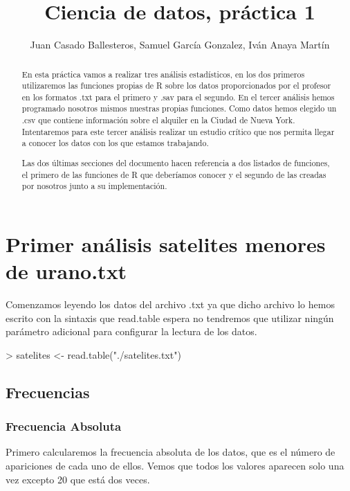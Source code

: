 \documentclass [a4paper] {article}
\title{Ciencia de datos, práctica 1}
\author{Juan Casado Ballesteros, Samuel García Gonzalez, Iván Anaya Martín}
\begin{document}
\maketitle

\begin{abstract}
En esta práctica vamos a realizar tres análisis estadísticos, 
en los dos primeros utilizaremos las funciones propias de R sobre los datos proporcionados por el profesor en los formatos .txt para el primero y .sav para el segundo.
En el tercer análisis hemos programado nosotros mismos nuestras propias funciones. 
Como datos hemos elegido un .csv que contiene información sobre el alquiler en la Ciudad de Nueva York.
Intentaremos para este tercer análisis realizar un estudio crítico que nos permita llegar a conocer los datos con los que estamos trabajando.

Las dos últimas secciones del documento hacen referencia a dos listados de funciones, 
el primero de las funciones de R que deberíamos conocer y el segundo de las creadas por nosotros junto a su implementación.
\end{abstract}

\newpage
\tableofcontents
\newpage


\section{Primer análisis satelites menores de urano.txt}

Comenzamos leyendo los datos del archivo .txt ya que dicho archivo lo hemos escrito con la sintaxis que read.table espera 
no tendremos que utilizar ningún parámetro adicional para configurar la lectura de los datos.
\begin{Schunk}
\begin{Sinput}
> satelites <- read.table("./satelites.txt")
\end{Sinput}
\end{Schunk}

\subsection{Frecuencias}
\subsubsection{Frecuencia Absoluta}
Primero calcularemos la frecuencia absoluta de los datos, que es el número de apariciones de cada uno de ellos.
Vemos que todos los valores aparecen solo una vez excepto 20 que está dos veces.
\end{document}
